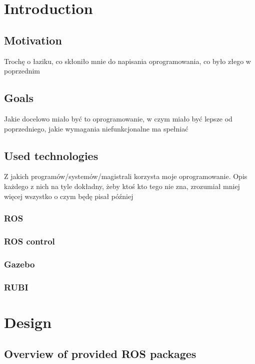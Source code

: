 \documentclass[english,inz,shortabstract]{iithesis}
\author         {Błażej Sowa}
\begin{document}
\chapter{Introduction}

\section{Motivation}
Trochę o łaziku, co skłoniło mnie do napisania oprogramowania, co było złego w poprzednim

\section{Goals}
Jakie docelowo miało być to oprogramowanie, w czym miało być lepsze od poprzedniego, jakie wymagania niefunkcjonalne ma spełniać

\section{Used technologies} %
Z jakich programów/systemów/magistrali korzysta moje oprogramowanie. Opis każdego z nich na tyle dokładny, żeby ktoś kto tego nie zna, zrozumiał mniej więcej wszystko o czym będę pisał później
\subsection{ROS}
\subsection{ROS control}
\subsection{Gazebo}
\subsection{RUBI}

\chapter{Design}
\section{Overview of provided ROS packages}




\end{document}
